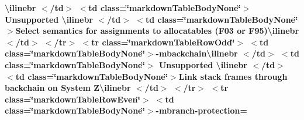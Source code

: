 \begin{longtabu}
{\bfseries{{\ttfamily \textbackslash{}ilinebr \texorpdfstring{$<$}{<}/td\texorpdfstring{$>$}{>} \texorpdfstring{$<$}{<}td class=\char`\"{}markdown\+Table\+Body\+None\char`\"{}\texorpdfstring{$>$}{>} Unsupported \textbackslash{}ilinebr \texorpdfstring{$<$}{<}/td\texorpdfstring{$>$}{>} \texorpdfstring{$<$}{<}td class=\char`\"{}markdown\+Table\+Body\+None\char`\"{}\texorpdfstring{$>$}{>}}Select semantics for assignments to allocatables (F03 or F95){\ttfamily \textbackslash{}ilinebr \texorpdfstring{$<$}{<}/td\texorpdfstring{$>$}{>} \texorpdfstring{$<$}{<}/tr\texorpdfstring{$>$}{>} \texorpdfstring{$<$}{<}tr class=\char`\"{}markdown\+Table\+Row\+Odd\char`\"{}\texorpdfstring{$>$}{>} \texorpdfstring{$<$}{<}td class=\char`\"{}markdown\+Table\+Body\+None\char`\"{}\texorpdfstring{$>$}{>}}-\/mbackchain{\ttfamily \textbackslash{}ilinebr \texorpdfstring{$<$}{<}/td\texorpdfstring{$>$}{>} \texorpdfstring{$<$}{<}td class=\char`\"{}markdown\+Table\+Body\+None\char`\"{}\texorpdfstring{$>$}{>} Unsupported \textbackslash{}ilinebr \texorpdfstring{$<$}{<}/td\texorpdfstring{$>$}{>} \texorpdfstring{$<$}{<}td class=\char`\"{}markdown\+Table\+Body\+None\char`\"{}\texorpdfstring{$>$}{>}}Link stack frames through backchain on System Z{\ttfamily \textbackslash{}ilinebr \texorpdfstring{$<$}{<}/td\texorpdfstring{$>$}{>} \texorpdfstring{$<$}{<}/tr\texorpdfstring{$>$}{>} \texorpdfstring{$<$}{<}tr class=\char`\"{}markdown\+Table\+Row\+Even\char`\"{}\texorpdfstring{$>$}{>} \texorpdfstring{$<$}{<}td class=\char`\"{}markdown\+Table\+Body\+None\char`\"{}\texorpdfstring{$>$}{>}}-\/mbranch-\/protection=}}


\end{longtabu}
